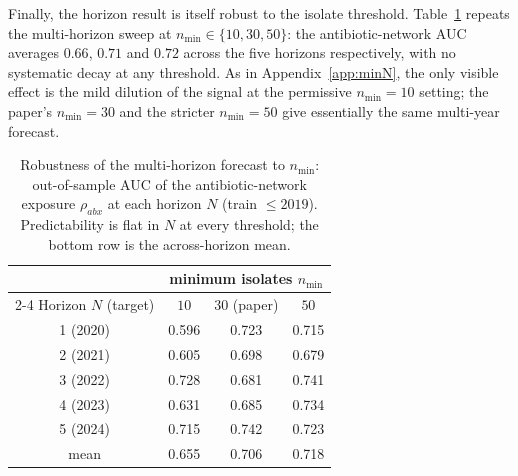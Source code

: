 Finally, the horizon result is itself robust to the isolate threshold.
Table~\ref{tab:horizon-minN} repeats the multi-horizon sweep at $n_{\min}\in\{10,30,50\}$: the
antibiotic-network AUC averages $0.66$, $0.71$ and $0.72$ across the five horizons respectively, with
no systematic decay at any threshold. As in Appendix~\ref{app:minN}, the only visible effect is the
mild dilution of the signal at the permissive $n_{\min}=10$ setting; the paper's $n_{\min}=30$ and the
stricter $n_{\min}=50$ give essentially the same multi-year forecast.

\begin{table}[htbp]
\centering
\caption{Robustness of the multi-horizon forecast to $n_{\min}$: out-of-sample AUC of the
antibiotic-network exposure $\rho_{abx}$ at each horizon $N$ (train $\le 2019$). Predictability is flat
in $N$ at every threshold; the bottom row is the across-horizon mean.}
\label{tab:horizon-minN}
\small
\begin{tabular}{c ccc}
\toprule
 & \multicolumn{3}{c}{minimum isolates $n_{\min}$} \\
\cmidrule(lr){2-4}
Horizon $N$ (target) & $10$ & $30$ (paper) & $50$ \\
\midrule
1 (2020) & 0.596 & 0.723 & 0.715 \\
2 (2021) & 0.605 & 0.698 & 0.679 \\
3 (2022) & 0.728 & 0.681 & 0.741 \\
4 (2023) & 0.631 & 0.685 & 0.734 \\
5 (2024) & 0.715 & 0.742 & 0.723 \\
\midrule
mean     & 0.655 & 0.706 & 0.718 \\
\bottomrule
\end{tabular}
\end{table}
